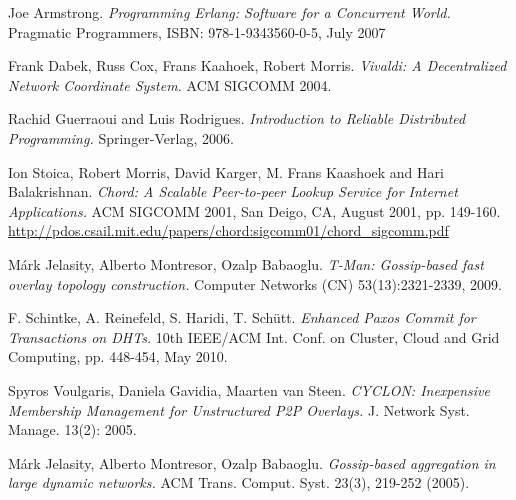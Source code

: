 \documentclass[a4paper]{scrreprt}
\begin{document}
\begin{thebibliography}{9}

Joe Armstrong.
\newblock \emph{Programming Erlang: Software for a Concurrent World.}
\newblock Pragmatic Programmers, ISBN: 978-1-9343560-0-5, July 2007

Frank Dabek, Russ Cox, Frans Kaahoek, Robert Morris.
\newblock \emph{Vivaldi: A Decentralized Network Coordinate System.}
\newblock ACM SIGCOMM 2004.

Rachid Guerraoui and Luis Rodrigues.
\newblock \emph{Introduction to Reliable Distributed Programming.}
\newblock Springer-Verlag, 2006.

Ion Stoica, Robert Morris, David Karger, M. Frans Kaashoek and Hari Balakrishnan.
\newblock \emph{Chord: A Scalable Peer-to-peer Lookup Service for Internet Applications.}
\newblock ACM SIGCOMM 2001, San Deigo, CA, August 2001, pp. 149-160.
\newblock \href{http://pdos.csail.mit.edu/papers/chord:sigcomm01/chord_sigcomm.pdf}{http://pdos.csail.mit.edu/papers/chord:sigcomm01/chord\_sigcomm.pdf}

M{\'a}rk Jelasity, Alberto Montresor, Ozalp Babaoglu.
\newblock \emph{T-Man: Gossip-based fast overlay topology construction.}
\newblock Computer Networks (CN) 53(13):2321-2339, 2009.

F. Schintke, A. Reinefeld, S. Haridi, T. Sch{\"u}tt.
\newblock \emph{Enhanced Paxos Commit for Transactions on DHTs.}
\newblock 10th IEEE/ACM Int. Conf. on Cluster, Cloud and Grid Computing, pp. 448-454,
May 2010.

Spyros Voulgaris, Daniela Gavidia, Maarten van Steen.
\newblock \emph{CYCLON: Inexpensive Membership Management for Unstructured P2P Overlays.}
\newblock J. Network Syst. Manage. 13(2): 2005.

M{\'a}rk Jelasity, Alberto Montresor, Ozalp Babaoglu.
\newblock \emph{Gossip-based aggregation in large dynamic networks.}
\newblock ACM Trans. Comput. Syst. 23(3), 219-252 (2005).

\end{thebibliography}

\printindex
\end{document}
